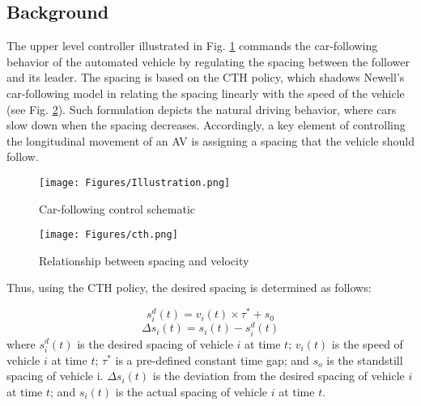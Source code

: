 \documentclass{article}
\begin{document}
\subsection{Background}
The upper level controller illustrated in Fig. \ref{fig:illustration} commands the car-following behavior of the automated vehicle by regulating the spacing between the follower and its leader. The spacing is based on the CTH policy, which shadows Newell's car-following model in relating the spacing linearly with the speed of the vehicle (see Fig. \ref{fig:cth}). Such formulation depicts the natural driving behavior, where cars slow down when the spacing decreases. Accordingly, a key element of controlling the longitudinal movement of an AV is assigning a spacing that the vehicle should follow. 

\begin{figure}[!htb]
    \centering
    \centerline{\texttt{[image: Figures/Illustration.png]}}
    \caption{Car-following control schematic}
    \label{fig:illustration}
\end{figure}

\begin{figure}[!htb]
    \centering
    \centerline{\texttt{[image: Figures/cth.png]}}
    \caption{Relationship between spacing and velocity}
    \label{fig:cth}
\end{figure}

Thus, using the CTH policy, the desired spacing is determined as follows: 

\begin{equation}
\label{eq:spacing}
s_i^d(t) = v_i(t)\times \tau^* + s_0
\end{equation}
\begin{equation}
\Delta s_i(t) = s_i(t) - s_i^d(t)
\end{equation}
where $s_i^d(t)$ is the desired spacing of vehicle $i$ at time $t$; $v_i(t)$ is the speed of vehicle $i$ at time $t$; $\tau^*$ is a pre-defined constant time gap; and $s_o$ is the standstill spacing of vehicle i. $\Delta s_i(t)$ is the deviation from the desired spacing of vehicle $i$ at time $t$; and $s_i(t)$ is the actual spacing of vehicle $i$ at time $t$. 
\end{document}
